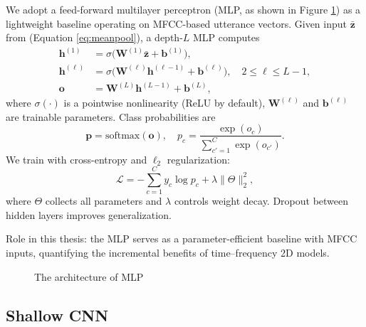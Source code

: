 We adopt a feed-forward multilayer perceptron (MLP, as shown in Figure \ref{fig:mlp arch}) as a lightweight baseline operating on MFCC-based utterance vectors. Given input \(\bar{\mathbf{z}}\) from (Equation \ref{eq:meanpool}), a depth-\(L\) MLP computes
\begin{align}\label{eq:mlp}
\mathbf{h}^{(1)} &= \sigma\!\big( \mathbf{W}^{(1)} \bar{\mathbf{z}} + \mathbf{b}^{(1)} \big),\\
\mathbf{h}^{(\ell)} &= \sigma\!\big( \mathbf{W}^{(\ell)} \mathbf{h}^{(\ell-1)} + \mathbf{b}^{(\ell)} \big), \quad 2\le \ell \le L-1,\\
\mathbf{o} &= \mathbf{W}^{(L)} \mathbf{h}^{(L-1)} + \mathbf{b}^{(L)},
\end{align}
where \(\sigma(\cdot)\) is a pointwise nonlinearity (ReLU by default), \(\mathbf{W}^{(\ell)}\) and \(\mathbf{b}^{(\ell)}\) are trainable parameters. Class probabilities are
\begin{equation}\label{eq:softmax}
\mathbf{p} = \mathrm{softmax}(\mathbf{o}), \quad p_c = \frac{\exp(o_c)}{\sum_{c'=1}^{C} \exp(o_{c'})}.
\end{equation}
We train with cross-entropy and \(\ell_2\) regularization:
\begin{equation}\label{eq:ce}
\mathcal{L} = - \sum_{c=1}^{C} y_c \log p_c + \lambda \lVert \Theta \rVert_2^2,
\end{equation}
where \(\Theta\) collects all parameters and \(\lambda\) controls weight decay. Dropout between hidden layers improves generalization.

Role in this thesis: the MLP serves as a parameter-efficient baseline with MFCC inputs, quantifying the incremental benefits of time–frequency 2D models.


\begin{figure}[h!tbp]
    \centering
    \caption{The architecture of MLP }
    \label{fig:mlp arch}
    
  \end{figure}

\subsection{Shallow CNN}

